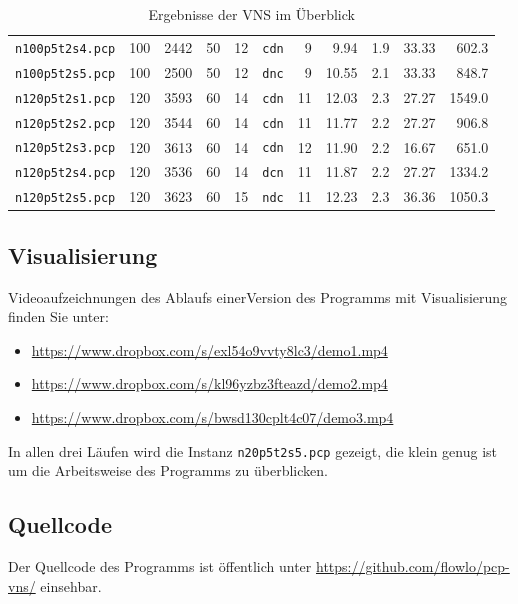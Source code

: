 \documentclass[paper=a4,fontsize=12pt]{scrartcl}
\begin{document}
\begin{table}[!htbp]
\begin{tabular}{c|rrr|r|c|rrr|r|r}
\texttt{n100p5t2s4.pcp} & 100	& 2442	& 50	& 12 & \texttt{cdn} & 9 & 9.94 & 1.9 & 33.33 & 602.3\\
\texttt{n100p5t2s5.pcp} & 100	& 2500	& 50	& 12 & \texttt{dnc} & 9 & 10.55 & 2.1 & 33.33 & 848.7\\
\texttt{n120p5t2s1.pcp} & 120	& 3593	& 60	& 14 & \texttt{cdn} & 11 & 12.03 & 2.3 & 27.27 & 1549.0\\
\texttt{n120p5t2s2.pcp} & 120	& 3544	& 60	& 14 & \texttt{cdn} & 11 & 11.77 & 2.2 & 27.27 & 906.8\\
\texttt{n120p5t2s3.pcp} & 120	& 3613	& 60	& 14 & \texttt{cdn} & 12 & 11.90 & 2.2 & 16.67 & 651.0\\
\texttt{n120p5t2s4.pcp} & 120	& 3536	& 60	& 14 & \texttt{dcn} & 11 & 11.87 & 2.2 & 27.27 & 1334.2\\
\texttt{n120p5t2s5.pcp} & 120	& 3623	& 60	& 15 & \texttt{ndc} & 11 & 12.23 & 2.3 & 36.36 & 1050.3\\
\end{tabular}
\caption{Ergebnisse der VNS im Überblick}
\label{tab:result}
\end{table}

\subsection{Visualisierung}

Videoaufzeichnungen des Ablaufs einerVersion des Programms mit Visualisierung finden Sie unter:

\begin{itemize}
	\item \url{https://www.dropbox.com/s/exl54o9vvty8lc3/demo1.mp4}
	\item \url{https://www.dropbox.com/s/kl96yzbz3fteazd/demo2.mp4}
	\item \url{https://www.dropbox.com/s/bwsd130cplt4c07/demo3.mp4}
\end{itemize}

In allen drei Läufen wird die Instanz \texttt{n20p5t2s5.pcp} gezeigt, die klein genug ist um die Arbeitsweise des Programms zu überblicken.

\subsection{Quellcode}

Der Quellcode des Programms ist öffentlich unter \url{https://github.com/flowlo/pcp-vns/} einsehbar.
\end{document}
